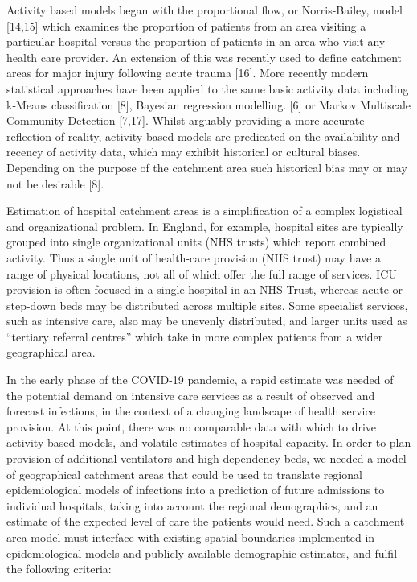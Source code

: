\documentclass[
]{article}
\begin{document}
Activity based models began with the proportional flow, or
Norris-Bailey, model {[}14,15{]} which examines the proportion of
patients from an area visiting a particular hospital versus the
proportion of patients in an area who visit any health care provider. An
extension of this was recently used to define catchment areas for major
injury following acute trauma {[}16{]}. More recently modern statistical
approaches have been applied to the same basic activity data including
k-Means classification {[}8{]}, Bayesian regression modelling. {[}6{]}
or Markov Multiscale Community Detection {[}7,17{]}. Whilst arguably
providing a more accurate reflection of reality, activity based models
are predicated on the availability and recency of activity data, which
may exhibit historical or cultural biases. Depending on the purpose of
the catchment area such historical bias may or may not be desirable
{[}8{]}.

Estimation of hospital catchment areas is a simplification of a complex
logistical and organizational problem. In England, for example, hospital
sites are typically grouped into single organizational units (NHS
trusts) which report combined activity. Thus a single unit of
health-care provision (NHS trust) may have a range of physical
locations, not all of which offer the full range of services. ICU
provision is often focused in a single hospital in an NHS Trust, whereas
acute or step-down beds may be distributed across multiple sites. Some
specialist services, such as intensive care, also may be unevenly
distributed, and larger units used as ``tertiary referral centres''
which take in more complex patients from a wider geographical area.

In the early phase of the COVID-19 pandemic, a rapid estimate was needed
of the potential demand on intensive care services as a result of
observed and forecast infections, in the context of a changing landscape
of health service provision. At this point, there was no comparable data
with which to drive activity based models, and volatile estimates of
hospital capacity. In order to plan provision of additional ventilators
and high dependency beds, we needed a model of geographical catchment
areas that could be used to translate regional epidemiological models of
infections into a prediction of future admissions to individual
hospitals, taking into account the regional demographics, and an
estimate of the expected level of care the patients would need. Such a
catchment area model must interface with existing spatial boundaries
implemented in epidemiological models and publicly available demographic
estimates, and fulfil the following criteria:
\end{document}
